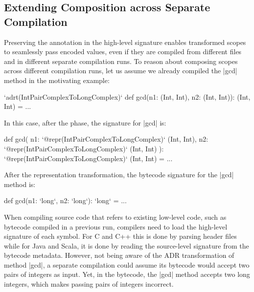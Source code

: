 \subsection{Extending Composition across Separate Compilation}
\label{sec:ildl:sepatate-compilation}

Preserving the annotation in the high-level signature enables transformed scopes to seamlessly pass encoded values, even if they are compiled from different files and in different separate compilation runs. To reason about composing scopes across different compilation runs, let us assume we already compiled the |gcd| method in the motivating example:

\begin{lstlisting-nobreak}
`adrt(IntPairComplexToLongComplex)` {
  def gcd(n1: (Int, Int), n2: (Int, Int)): (Int, Int) = ...
}
\end{lstlisting-nobreak}

In this case, after the \inject{} phase, the signature for |gcd| is:

\begin{lstlisting-nobreak}
def gcd(
    n1: `@repr(IntPairComplexToLongComplex)` (Int, Int),
    n2: `@repr(IntPairComplexToLongComplex)` (Int, Int)
  ): `@repr(IntPairComplexToLongComplex)` (Int, Int) = ...
\end{lstlisting-nobreak}

After the representation transformation, the bytecode signature for the |gcd| method is:

\begin{lstlisting-nobreak}
def gcd(n1: `long`, n2: `long`): `long` = ...
\end{lstlisting-nobreak}

When compiling source code that refers to existing low-level code, such as bytecode compiled in a previous run, compilers need to load the high-level signature of each symbol. For C and C++ this is done by parsing header files while for Java and Scala, it is done by reading the source-level signature from the bytecode metadata. However, not being aware of the ADR transformation of method |gcd|, a separate compilation could assume its bytecode would accept two pairs of integers as input. Yet, in the bytecode, the |gcd| method accepts two long integers, which makes passing pairs of integers incorrect.

